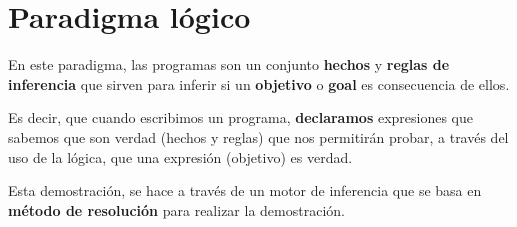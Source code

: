 \section{Paradigma lógico}
En este paradigma, las programas son un conjunto \textbf{hechos} y \textbf{reglas de inferencia} que sirven para inferir si un \textbf{objetivo} o \textbf{goal} es consecuencia de ellos.

Es decir, que cuando escribimos un programa, \textbf{declaramos} expresiones que sabemos que son verdad (hechos y reglas) que nos permitirán probar, a través del uso de la lógica, que una expresión (objetivo) es verdad.

Esta demostración, se hace a través de un motor de inferencia que se basa en \textbf{método de resolución} para realizar la demostración.